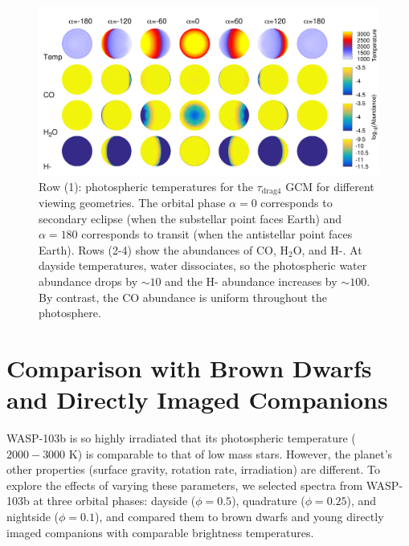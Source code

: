\documentclass[twocolumn, trackchanges]{aastex61}
\begin{document}
\begin{figure}
	\includegraphics[width = 1.0\textwidth]{fig16.pdf}
	\caption{Row (1): photospheric temperatures for the $\tau_\mathrm{drag4}$ GCM for different viewing geometries.  The orbital phase $\alpha=0$ corresponds to secondary eclipse (when the substellar point faces Earth) and $\alpha=180$ corresponds to transit (when the antistellar point faces Earth). Rows (2-4) show the abundances of CO, H$_2$O, and H-. At dayside temperatures, water dissociates, so the photospheric water abundance drops by $\sim10$ and the H- abundance increases by $\sim100$. By contrast, the CO abundance is uniform throughout the photosphere.}
\label{fig:GCMabundance}
\end{figure}

\section{Comparison with Brown Dwarfs and Directly Imaged Companions}
\label{sec:comparison}
WASP-103b is so highly irradiated that its photospheric temperature ($2000 - 3000$ K) is comparable to that of low mass stars. However, the planet's other properties (surface gravity, rotation rate, irradiation) are different. To explore the effects of varying these parameters, we selected spectra from WASP-103b at three orbital phases: dayside ($\phi = 0.5$), quadrature ($\phi = 0.25$), and nightside ($\phi = 0.1$), and compared them to brown dwarfs and young directly imaged companions with comparable brightness temperatures.
\end{document}
